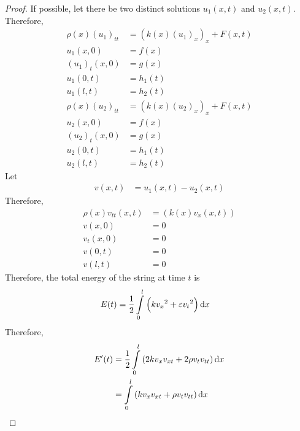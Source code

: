 \documentclass[titlepage, fleqn, a4paper, 12pt, twoside]{article}
\theoremstyle{definition}
\theoremstyle{theorem}
\begin{document}
\begin{proof}
	If possible, let there be two distinct solutions $u_1(x,t)$ and $u_2(x,t)$.\\
	Therefore,
	\begin{align*}
		\rho(x) (u_1)_{t t} & = \left( k(x) (u_1)_{x} \right)_x + F(x,t) \\
		u_1(x,0)            & = f(x)                                     \\
		(u_1)_t(x,0)        & = g(x)                                     \\
		u_1(0,t)            & = h_1(t)                                   \\
		u_1(l,t)            & = h_2(t)                                   \\
		\rho(x) (u_2)_{t t} & = \left( k(x) (u_2)_{x} \right)_x + F(x,t) \\
		u_2(x,0)            & = f(x)                                     \\
		(u_2)_t(x,0)        & = g(x)                                     \\
		u_2(0,t)            & = h_1(t)                                   \\
		u_2(l,t)            & = h_2(t)
	\end{align*}
	Let
	\begin{align*}
		v(x,t) & = u_1(x,t) - u_2(x,t)
	\end{align*}
	Therefore,
	\begin{align*}
		\rho(x) v_{t t}(x,t) & = \left( k(x) v_x(x,t) \right) \\
		v(x,0)               & = 0                            \\
		v_t(x,0)             & = 0                            \\
		v(0,t)               & = 0                            \\
		v(l,t)               & = 0
	\end{align*}
	Therefore, the total energy of the string at time $t$ is
	\begin{align*}
		E(t) & = \frac{1}{2} \int\limits_{0}^{l} \left( k {v_x}^2 + \varepsilon {v_t}^2 \right) \dif x
	\end{align*}
	Therefore,
	\begin{align*}
		E'(t) & = \frac{1}{2} \int\limits_{0}^{l} \left( 2 k v_x v_{x t} + 2 \rho v_t v_{t t} \right) \dif x \\
                      & = \int\limits_{0}^{l} \left( k v_x v_{x t} + \rho v_t v_{t t} \right) \dif x
	\end{align*}

\end{proof}
\end{document}
